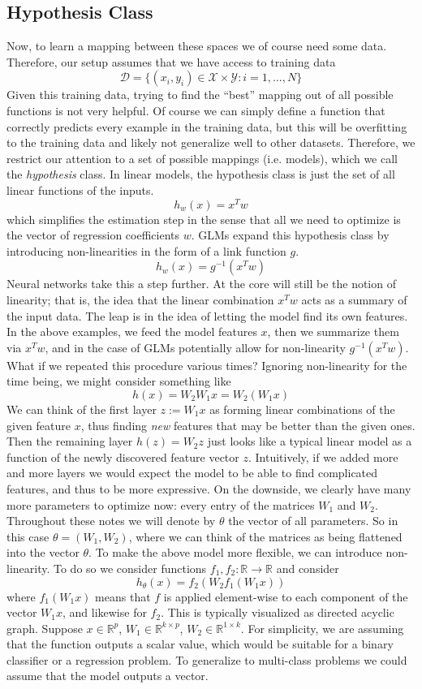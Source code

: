 \documentclass[12pt]{article}
\newcommand{\R}{\mathcal{R}}
\def\R{\mathbb{R}}
\begin{document}
\subsection{Hypothesis Class}
Now, to learn a mapping between these spaces we of course need some data. Therefore, our setup assumes that we have access to training data
\[\mathcal{D} = \{(x_i, y_i) \in \mathcal{X} \times \mathcal{Y}: i = 1, \dots, N\}\]
Given this training data, trying to find the ``best'' mapping out of all possible functions is not very helpful. Of course we can simply define a function that correctly predicts every example
in the training data, but this will be overfitting to the training data and likely not generalize well to other datasets. Therefore, we restrict our attention to a set of possible mappings (i.e. models), 
which we call the \textit{hypothesis} class. In linear models, the hypothesis class is just the set of all linear functions of the inputs.
\[h_w(x) = x^T w\]
which simplifies the estimation step in the sense that all we need to optimize is the vector of regression coefficients $w$.
GLMs expand this hypothesis class by introducing non-linearities in the form of a link function $g$. 
\[h_w(x) = g^{-1}(x^T w)\]
Neural networks take this a step further. At the core will still be the notion of linearity; that is, the idea that the linear combination $x^T w$ acts as a summary of the input data. The leap is in the 
idea of letting the model find its own features. In the above examples, we feed the model features $x$, then we summarize them via $x^T w$, and in the case of GLMs potentially allow for 
non-linearity $g^{-1}(x^T w)$. What if we repeated this procedure various times? Ignoring non-linearity for the time being, we might consider something like
\[h(x) = W_2 W_1 x = W_2 (W_1 x)\]
We can think of the first layer $z := W_1 x$ as forming linear combinations of the given feature $x$, thus finding \textit{new} features that may be better than the given ones. Then the 
remaining layer $h(z) = W_2 z$ just looks like a typical linear model as a function of the newly discovered feature vector $z$. Intuitively, if we added more and more layers we would expect 
the model to be able to find complicated features, and thus to be more expressive. On the downside, we clearly have many more parameters to optimize now: every entry of the matrices $W_1$
and $W_2$. Throughout these notes we will denote by $\theta$ the vector of all parameters. So in this case $\theta = (W_1, W_2)$, where we can think of the matrices as being flattened into the 
vector $\theta$. To make the above model more flexible, we can introduce non-linearity. To do so we consider functions $f_1, f_2: \R \to \R$ and consider
\[h_\theta(x) = f_2(W_2 f_1(W_1 x))\]
where $f_1(W_1 x)$ means that $f$ is applied element-wise to each component of the vector $W_1 x$, and likewise for $f_2$. This is typically visualized as directed acyclic graph. Suppose 
$x \in \R^p$, $W_1 \in \R^{k \times p}$, $W_2 \in \R^{1 \times k}$. For simplicity, we are assuming that the function outputs a scalar value, which would be suitable for a binary classifier or a regression
problem. To generalize to multi-class problems we could assume that the model outputs a vector. 
\end{document}
